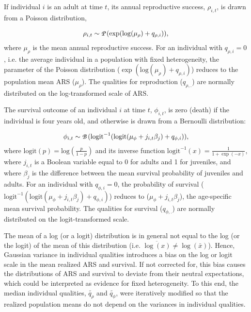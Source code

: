 If individual $i$ is an adult at time $t$, its annual reproductive success, $\rho_{i,t}$, is drawn from a Poisson distribution,

\begin{equation}
\rho_{i,t} \sim \text{{\fontfamily{pzc}\selectfont P }}(\exp(\log(\mu_{\rho})+q_{\rho,i}))\text{,}
\end{equation}
where $\mu_{\rho}$ is the mean annual reproductive success. For an individual with $q_{\rho,i}=0$, i.e. the average individual in a population with fixed heterogeneity, the parameter of the Poisson distribution ($\exp(\mathrm{log}(\mu_{\rho})+q_{\rho,i})$) reduces to the population mean ARS ($\mu_{\rho}$). The qualities for reproduction ($q_{\rho,.}$) are normally distributed on the log-transformed scale of ARS.

The survival outcome of an individual $i$ at time $t$, $\phi_{i,t}$, is zero (death) if the individual is four years old, and otherwise is drawn from a Bernoulli distribution:

\begin{equation}
\phi_{i,t} \sim \text{{\fontfamily{pzc}\selectfont B }}( \mathrm{logit}^{-1}(\mathrm{logit}(\mu_{\phi}+j_{i,t}\beta_{j})+q_{\phi,i})) \text{,}
\end{equation} 
where $\mathrm{logit}(p)= \mathrm{log}(\frac{p}{1-p})$ and its inverse function $\mathrm{logit}^{-1}(x)=\frac{1}{1+\exp(-x)}$, where $j_{i,t}$ is a Boolean variable equal to 0 for adults and 1 for juveniles, and where $\beta_{j}$ is the difference between the mean survival probability of juveniles and adults. For an individual with $q_{\phi,i}=0$, the probability of survival ($\mathrm{logit}^{-1}(\mathrm{logit}(\mu_{\phi}+j_{i,t}\beta_{j})+q_{\phi,i})$) reduces to ($\mu_{\phi}+j_{i,t}\beta_{j}$), the age-specific mean survival probability. The qualities for survival ($q_{\phi,.}$) are normally distributed on the logit-transformed scale.

The mean of a log (or a logit) distribution is in general not equal to the log (or the logit) of the mean of this distribution (i.e. $\overline{\log(x)} \neq \log(\bar{x})$). Hence, Gaussian variance in individual qualities introduces a bias on the log or logit scale in the mean realized ARS and survival. If not corrected for, this bias causes the distributions of ARS and survival to deviate from their neutral expectations, which could be interpreted as evidence for fixed heterogeneity. To this end, the median individual qualities, $\tilde{q_{\rho}}$ and $\tilde{q_{\phi}}$, were iteratively modified so that the realized population means do not depend on the variances in individual qualities.

